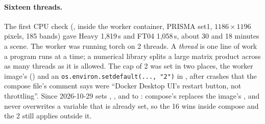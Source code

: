 \paragraph{Sixteen threads.} The first CPU check (, inside the worker container, PRISMA set1,
$1186\times1196$ pixels, 185 bands) gave Heavy 1,819\,s and FT04 1,058\,s, about 30 and 18 minutes a scene. The
worker was running torch on 2 threads. A \emph{thread} is one line of work a program runs at a time;
a numerical library splits a large matrix product across as many threads as it is allowed. The cap of 2 was set in
two places, the worker image's  () and an
\lstinline!os.environ.setdefault(..., "2")! in , after crashes that the
compose file's comment says were ``Docker Desktop UI's restart button, not throttling''. Since 2026-10-29
 sets , ,  and
 to : compose's  replaces the image's
, and  never overwrites a variable that is already set, so the 16 wins inside compose and
the 2 still applies outside it.

